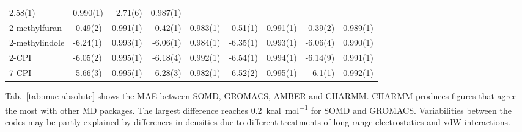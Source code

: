 \documentclass[journal=jctcce,manuscript=article]{achemso}
\begin{document}
\begin{table}[]
\begin{minipage}{\linewidth}
{\begin{tabular}{llrrrrrrr}
         2.58(1) & 0.990(1) &
         2.71(6) & 0.987(1) \\
        2-methylfuran  &
        -0.49(2) & 0.991(1) &
        -0.42(1) & 0.983(1) &
        -0.51(1) & 0.991(1) &
        -0.39(2) & 0.989(1) \\
        2-methylindole  &
        -6.24(1) & 0.993(1) &
        -6.06(1) & 0.984(1) &
        -6.35(1) & 0.993(1) &
        -6.06(4) & 0.990(1) \\
        2-CPI  &
        -6.05(2) & 0.995(1) &
        -6.18(4) & 0.992(1) &
        -6.54(1) & 0.994(1) &
        -6.14(9) & 0.991(1) \\
        7-CPI  &
        -5.66(3) & 0.995(1) &
        -6.28(3) & 0.982(1) &
        -6.52(2) & 0.995(1) &
        -6.1(1) & 0.992(1) \\
     \bottomrule
      \end{tabular}
    }
  \end{minipage}
\end{table}

Tab.~\ref{tab:mue-absolute} shows the MAE between SOMD, GROMACS, AMBER and CHARMM. CHARMM produces figures that agree the most with other MD packages. The largest difference reaches \SI{0.2}{kcal.mol^{-1}} for SOMD and GROMACS. Variabilities between the codes may be partly explained by differences in densities due to different treatments of long range electrostatics and vdW interactions.

\begin{table}[]
 \begin{minipage}{\linewidth}
   \caption{Mean Absolute Error (MAE) (\SI{}{kcal.mol^{-1}}) between relative free energies obtained with the absolute protocol for the SOMD, GROMACS, AMBER and CHARMM packages.}\label{tab:mue-absolute}
 \end{minipage}
\end{table}
\end{document}
